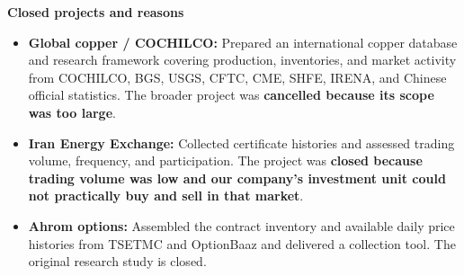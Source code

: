\documentclass[11pt,a4paper]{article}
\begin{document}
\textbf{\color{navy}Closed projects and reasons}

\begin{itemize}
  \item \textbf{Global copper / COCHILCO:} Prepared an international copper database and research framework covering production, inventories, and market activity from COCHILCO, BGS, USGS, CFTC, CME, SHFE, IRENA, and Chinese official statistics. The broader project was \textbf{cancelled because its scope was too large}.
  \item \textbf{Iran Energy Exchange:} Collected certificate histories and assessed trading volume, frequency, and participation. The project was \textbf{closed because trading volume was low and our company's investment unit could not practically buy and sell in that market}.
  \item \textbf{Ahrom options:} Assembled the contract inventory and available daily price histories from TSETMC and OptionBaaz and delivered a collection tool. The original research study is closed.
\end{itemize}
\end{document}

